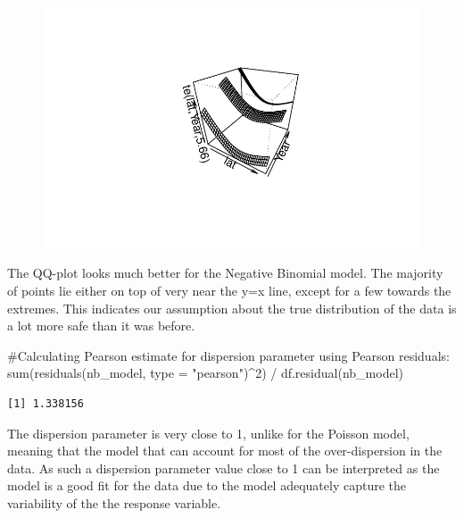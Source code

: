 \documentclass[
  letterpaper,
  DIV=11,
  numbers=noendperiod]{scrartcl}
\newenvironment{Shaded}{\begin{snugshade}}{\end{snugshade}}
\newcommand{\AttributeTok}[1]{\textcolor[rgb]{0.40,0.45,0.13}{#1}}
\newcommand{\CommentTok}[1]{\textcolor[rgb]{0.37,0.37,0.37}{#1}}
\newcommand{\DecValTok}[1]{\textcolor[rgb]{0.68,0.00,0.00}{#1}}
\newcommand{\FunctionTok}[1]{\textcolor[rgb]{0.28,0.35,0.67}{#1}}
\newcommand{\NormalTok}[1]{\textcolor[rgb]{0.00,0.23,0.31}{#1}}
\newcommand{\SpecialCharTok}[1]{\textcolor[rgb]{0.37,0.37,0.37}{#1}}
\newcommand{\StringTok}[1]{\textcolor[rgb]{0.13,0.47,0.30}{#1}}
\begin{document}
\begin{figure}[H]

{\centering \includegraphics{Group34Coursework_files/figure-pdf/unnamed-chunk-15-11.pdf}

}

\end{figure}

The QQ-plot looks much better for the Negative Binomial model. The
majority of points lie either on top of very near the y=x line, except
for a few towards the extremes. This indicates our assumption about the
true distribution of the data is a lot more safe than it was before.

\begin{Shaded}
\begin{Highlighting}[]
\CommentTok{\#Calculating Pearson estimate for dispersion parameter using Pearson residuals:}
\FunctionTok{sum}\NormalTok{(}\FunctionTok{residuals}\NormalTok{(nb\_model, }\AttributeTok{type =} \StringTok{"pearson"}\NormalTok{)}\SpecialCharTok{\^{}}\DecValTok{2}\NormalTok{) }\SpecialCharTok{/} \FunctionTok{df.residual}\NormalTok{(nb\_model)}
\end{Highlighting}
\end{Shaded}

\begin{verbatim}
[1] 1.338156
\end{verbatim}

The dispersion parameter is very close to 1, unlike for the Poisson
model, meaning that the model that can account for most of the
over-dispersion in the data. As such a dispersion parameter value close
to 1 can be interpreted as the model is a good fit for the data due to
the model adequately capture the variability of the the response
variable.
\end{document}
